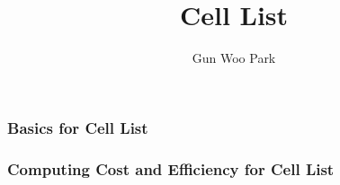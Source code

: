 \documentclass[slidestop, compress, mathserif]{beamer}
\title{Cell List}
\author{Gun Woo Park}
\institute{DICMaPI, University of Naples Federico II}
\begin{document}
\begin{frame}
  \maketitle
\end{frame}

\begin{frame}
  \frametitle<presentation>{Basics for Cell List}
\end{frame}

\begin{frame}
  \frametitle<presentation>{Computing Cost and Efficiency for Cell List}

\end{frame}

\begin{frame}
\end{frame}
\end{document}
